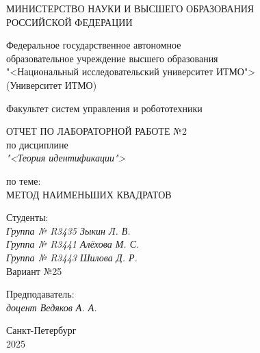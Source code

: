 \thispagestyle{empty}

\begin{center}
    МИНИСТЕРСТВО НАУКИ И ВЫСШЕГО ОБРАЗОВАНИЯ \\ РОССИЙСКОЙ ФЕДЕРАЦИИ

    \vspace{20pt}

    Федеральное государственное автономное \\ образовательное учреждение высшего образования \\
    "<Национальный исследовательский университет ИТМО"> \\
    (Университет ИТМО)

    \vspace{20pt}

    Факультет систем управления и робототехники
\end{center}

\vfill

\begin{center}
    ОТЧЕТ ПО ЛАБОРАТОРНОЙ РАБОТЕ №2\\  
    по дисциплине \\
    \textit{"<Теория идентификации">}

    \vspace{20pt}

    по теме: \\
    \uppercase{Метод наименьших квадратов}
\end{center}

\vfill

    \noindent Студенты: \\
    \textit{Группа № R3435 \hfill Зыкин Л. В.} \\
    \textit{Группа № R3441 \hfill Алёхова М. С.} \\
    \textit{Группа № R3443 \hfill Шилова Д. Р.} \\
    \noindent Вариант №25 \\
    \vspace{20pt}

    \noindent Предподаватель: \\
    \textit{доцент \hfill Ведяков А. А.}

\vfill

\begin{center}
    Санкт-Петербург \\ 2025
\end{center}